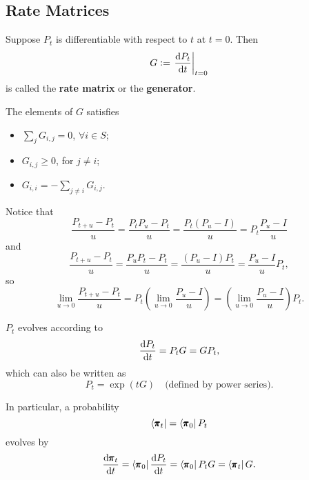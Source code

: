 \subsection{Rate Matrices}

\begin{definition}
    Suppose $P_t$ is differentiable with respect to $t$ at $t = 0$. Then 
    \begin{equation*}
        G:= \left. \frac{\dif P_t}{\dif t} \right|_{t = 0}
    \end{equation*}
    is called the \textbf{rate matrix} or the \textbf{generator}.
\end{definition}

\begin{remark}
    The elements of $G$ satisfies
    \begin{itemize}
        \item $\sum_{j} G_{i,j} = 0$, $\forall i \in S$;
        \item $G_{i,j} \ge 0$, for $j \neq i$;
        \item $G_{i,i} = - \sum_{j \neq i} G_{i,j}$.
    \end{itemize} 
\end{remark}

Notice that 
\begin{equation*}
    \frac{P_{t+u} - P_t}{u} =  \frac{P_t P_u - P_t}{u} = \frac{P_t (P_u - I)}{u} = P_t \frac{P_u - I}{u}
\end{equation*}
and
\begin{equation*}
    \frac{P_{t+u} - P_t}{u} =  \frac{P_u P_t - P_t}{u} = \frac{(P_u - I)P_t}{u} = \frac{P_u - I}{u} P_t,
\end{equation*}
so 
\begin{equation*}
    \lim_{u \to 0} \frac{P_{t+u} - P_t}{u} =  P_t \left(\lim_{u \to 0}  \frac{P_u - I}{u}\right)  = \left(\lim_{u \to 0} \frac{P_u - I}{u}\right) P_t.
\end{equation*}

\begin{proposition}
    $P_t$ evolves according to 
    \begin{equation*}
        \frac{\dif P_t}{\dif t} = P_t G = G P_t,
    \end{equation*}
    which can also be written as 
    \begin{equation*}
        P_t = \exp(tG) \quad \text{(defined by power series)}.
    \end{equation*}

    In particular, a probability 
    \begin{equation*}
        \left< \pmb{\pi}_t \right| = \left< \pmb{\pi}_0 \right| P_t 
    \end{equation*}
    evolves by 
    \begin{equation*}
        \frac{\dif \mbf{\pi}_t}{\dif t} = \left< \mbf{\pi}_0 \right| \frac{\dif P_t}{\dif t} = \left< \mbf{\pi}_0 \right| P_t G = \left< \mbf{\pi}_t \right| G.
    \end{equation*}
\end{proposition}


